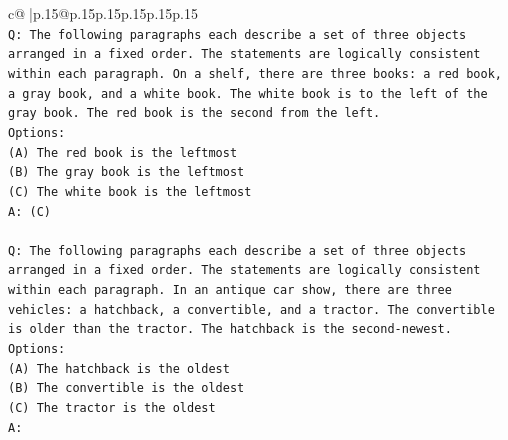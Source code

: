 \documentclass{article}
\begin{document}
{\begin{supertabular}{c@{$\;$}|p{.15\linewidth}@{}p{.15\linewidth}p{.15\linewidth}p{.15\linewidth}p{.15\linewidth}p{.15\linewidth}}
{{{\\ 
\texttt{Q: The following paragraphs each describe a set of three objects arranged in a fixed order. The statements are logically consistent within each paragraph. On a shelf, there are three books: a red book, a gray book, and a white book. The white book is to the left of the gray book. The red book is the second from the left.} \\
\texttt{Options:} \\
\texttt{(A) The red book is the leftmost} \\
\texttt{(B) The gray book is the leftmost} \\
\texttt{(C) The white book is the leftmost} \\
\texttt{A: (C)} \\
\\ 
\texttt{Q: The following paragraphs each describe a set of three objects arranged in a fixed order. The statements are logically consistent within each paragraph. In an antique car show, there are three vehicles: a hatchback, a convertible, and a tractor. The convertible is older than the tractor. The hatchback is the second{-}newest.} \\
\texttt{Options:} \\
\texttt{(A) The hatchback is the oldest} \\
\texttt{(B) The convertible is the oldest} \\
\texttt{(C) The tractor is the oldest} \\
\texttt{A:} \\
            }
        }
    }
     \\ \\


\end{supertabular}}
\end{document}
